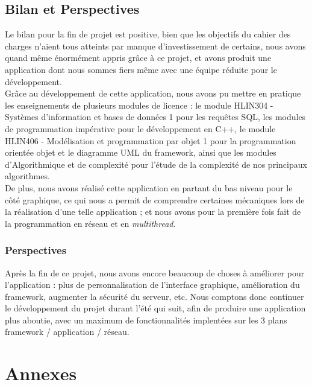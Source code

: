 \documentclass[twoside]{report}
\begin{document}
\chapter{Bilan et Perspectives} %
Le bilan pour la fin de projet est positive, bien que les objectifs du cahier des charges n'aient tous atteints par manque d'investissement de certains, nous avons quand même énormément appris grâce à ce projet, et avons produit une application dont nous sommes fiers même avec une équipe réduite pour le développement. \\
Grâce au développement de cette application, nous avons pu mettre en pratique les enseignements de plusieurs modules de licence : le module HLIN304 - Systèmes d'information et bases de données 1 pour les requêtes SQL, les modules de programmation impérative pour le développement en C++, le module HLIN406 - Modélisation et programmation par objet 1 pour la programmation orientée objet et le diagramme UML du framework, ainsi que les modules d'Algorithmique et de complexité pour l'étude de la complexité de nos principaux algorithmes. \\
De plus, nous avons réalisé cette application en partant du bas niveau pour le côté graphique, ce qui nous a permit de comprendre certaines mécaniques lors de la réalisation d'une telle application ; et nous avons pour la première fois fait de la programmation en réseau et en \textit{multithread}.

\section*{Perspectives}
Après la fin de ce projet, nous avons encore beaucoup de choses à améliorer pour l'application : plus de personnalisation de l'interface graphique, amélioration du framework, augmenter la sécurité du serveur, etc. Nous comptons donc continuer le développement du projet durant l'été qui suit, afin de produire une application plus aboutie, avec un maximum de fonctionnalités implentées sur les 3 plans framework / application / réseau.

\part*{Annexes}
\end{document}
